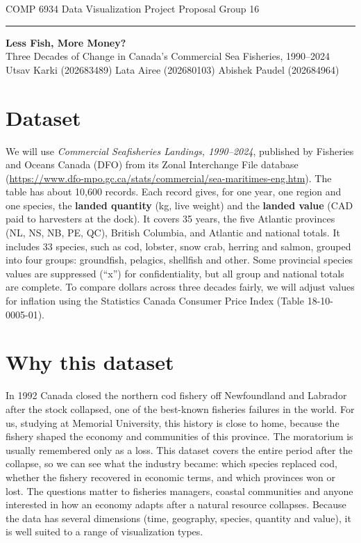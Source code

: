 \documentclass[12pt,letterpaper]{article}
\begin{document}
{\small\color{ink2}COMP 6934 Data Visualization \hfill Project Proposal \hfill Group 16}\\[-4pt]
{\color{rule}\rule{\linewidth}{0.5pt}}

\begin{center}
{\Large\bfseries Less Fish, More Money?}\\[3pt]
{\large Three Decades of Change in Canada's Commercial Sea Fisheries, 1990--2024}\\[6pt]
{\small Utsav Karki (202683489) \quad\textperiodcentered\quad Lata Airee (202680103) \quad\textperiodcentered\quad Abishek Paudel (202684964)}
\end{center}

\section{Dataset}
We will use \emph{Commercial Seafisheries Landings, 1990--2024}, published by Fisheries and
Oceans Canada (DFO) from its Zonal Interchange File database
(\url{https://www.dfo-mpo.gc.ca/stats/commercial/sea-maritimes-eng.htm}). The table has about
10{,}600 records. Each record gives, for one year, one region and one species, the
\textbf{landed quantity} (kg, live weight) and the \textbf{landed value} (CAD paid to harvesters at
the dock). It covers 35 years, the five Atlantic provinces (NL, NS, NB, PE, QC), British
Columbia, and Atlantic and national totals. It includes 33 species, such as cod, lobster, snow
crab, herring and salmon, grouped into four groups: groundfish, pelagics, shellfish and other.
Some provincial species values are suppressed (``x'') for confidentiality, but all group and
national totals are complete. To compare dollars across three decades fairly, we will adjust
values for inflation using the Statistics Canada Consumer Price Index (Table 18-10-0005-01).

\section{Why this dataset}
In 1992 Canada closed the northern cod fishery off Newfoundland and Labrador after the stock
collapsed, one of the best-known fisheries failures in the world. For us, studying at Memorial
University, this history is close to home, because the fishery shaped the economy and
communities of this province. The moratorium is usually remembered only as a loss. This dataset
covers the entire period after the collapse, so we can see what the industry became: which
species replaced cod, whether the fishery recovered in economic terms, and which provinces won
or lost. The questions matter to fisheries managers, coastal communities and anyone interested
in how an economy adapts after a natural resource collapses. Because the data has several
dimensions (time, geography, species, quantity and value), it is well suited to a range of
visualization types.
\end{document}

